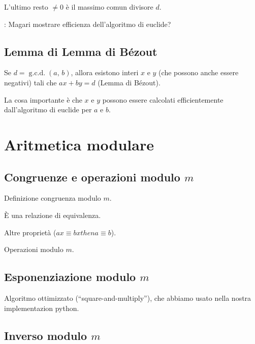 \documentclass[pdflatex,11pt,a4paper,oneside]{article}
\newcommand{\then}[0]{then }
\newcommand{\XXX}[1][XXX]{\text{\bfseries{\color{red}{\emph{#1}}}}}
\newcommand{\TODO}[0]{\XXX[TODO]}
\newcommand{\congruent}[0]{\equiv}
\newcommand{\gcdop}[0]{\ensuremath{\operatorname{g.c.d.}}}
\newcommand{\xgcd}[1]{\ensuremath{\gcdop\left({#1}\right)}}
\renewcommand{\gcd}[2]{\xgcd{{#1},\,{#2}}}
\begin{document}
\noindent
L'ultimo resto $\neq 0$ \`e il massimo comun divisore $d$.

\noindent
\TODO: Magari mostrare efficienza dell'algoritmo di euclide?


\subsection{Lemma di Lemma di B\'ezout}

Se $d = \gcd{a}{b}$, allora esistono interi $x$ e $y$ (che possono 
anche essere negativi) tali che $ax + by = d$ (Lemma di B\'ezout).

La cosa importante \`e che $x$ e $y$ possono essere calcolati
efficientemente dall'algoritmo di euclide per $a$ e $b$.


\section{Aritmetica modulare}


\subsection{Congruenze e operazioni modulo $m$}

Definizione congruenza modulo $m$.

\`E una relazione di equivalenza.

Altre propriet\`a ($ax \congruent bx \then a \congruent b$).

Operazioni modulo $m$.


\subsection{Esponenziazione modulo $m$}

Algoritmo ottimizzato (``square-and-multiply''), che abbiamo usato nella
nostra implementazion python.


\subsection{Inverso modulo $m$}
\end{document}
